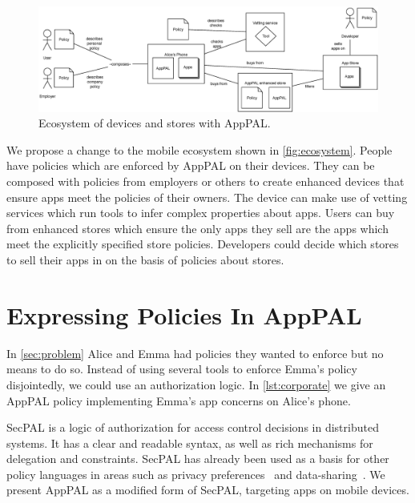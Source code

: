 \documentclass[]{llncs}
\begin{document}

\begin{figure}
\includegraphics{figures/overview.eps}
\caption{Ecosystem of devices and stores with AppPAL.}
\label{fig:ecosystem}
\end{figure}

We propose a change to the mobile ecosystem shown in \autoref{fig:ecosystem}.
People have policies which are enforced by AppPAL on their devices.
They can be composed with policies from employers or others to create enhanced devices that ensure apps meet the policies of their owners.
The device can make use of vetting services which run tools to infer complex properties about apps.
Users can buy from enhanced stores which ensure the only apps they sell are the apps which meet the explicitly specified store policies.
Developers could decide which stores to sell their apps in on the basis of policies about stores.

\section{Expressing Policies In AppPAL}
\label{sec:idea}

In \autoref{sec:problem} Alice and Emma had policies they wanted to enforce but no means to do so.
Instead of using several tools to enforce Emma's policy disjointedly, we could use an authorization logic.
In \autoref{lst:corporate} we give an AppPAL policy implementing Emma's app concerns on Alice's phone.

SecPAL is a logic of authorization for access control decisions in distributed systems.
It has a clear and readable syntax, as well as rich mechanisms for delegation and constraints.
SecPAL has already been used as a basis for other policy languages in areas such as privacy preferences~\cite{Becker:2009ula} and data-sharing~\cite{Aziz:2011vt}.
We present AppPAL as a modified form of SecPAL, targeting apps on mobile devices.
\end{document}
